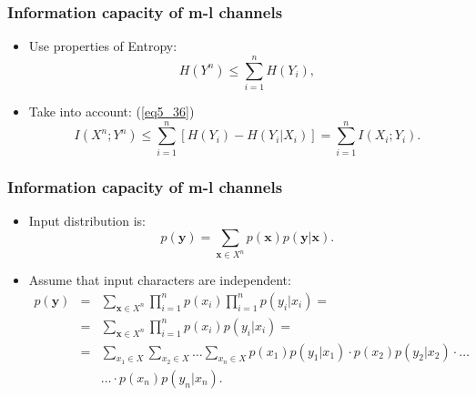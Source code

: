 \documentclass[14pt]{beamer}
\renewcommand{\vec}[1]{\ensuremath{\boldsymbol{#1}}}
\begin{document}
\begin{frame}
\frametitle{Information capacity of m-l channels}
\begin{itemize}

    \item Use properties of Entropy: 
    \begin{equation}
    \label{eq5_37} H\left( {Y^n} \right) \le \sum\limits_{i = 1}^n
    {H(Y_i )} ,
    \end{equation}

    
    \item Take into account: (\ref{eq5_36})
    \small{
    \begin{equation}
    \label{eq5_38} I\left( {X^n;Y^n} \right) \le \sum\limits_{i = 1}^n
    {\left[ {H\left( {Y_i } \right) - H\left( {Y_i \vert X_i }
    \right)} \right]} = \sum\limits_{i = 1}^n {I\left( {X_i ;Y_i }
    \right)} .
    \end{equation}
    }

\end{itemize}
\end{frame}



\begin{frame}
\frametitle{Information capacity of m-l channels}
\begin{itemize}
    
    \item Input distribution is:
    \[
    p({\vec y}) = \sum\limits_{{\vec x} \in X^n} {p({\vec x})%
    p({\vec y}\vert {\vec x})}.
    \]
    
    \item Assume that input characters are independent:
    \small{
    \begin{eqnarray*}
    p({\vec y})& =& \sum\limits_{{\vec x} \in X^n} {\prod\limits_{i =
    1}^n
    {p(x_i )} \prod\limits_{i = 1}^n {p(y_i \vert x_i )} }= \\
    &=& \sum\limits_{{\vec x} \in X^n} {\prod\limits_{i = 1}^n {p(x_i
    )p(y_i
    \vert x_i )} }= \\
    &=& \sum\limits_{x_1 \in X} \sum\limits_{x_2 \in X} \dots
    \sum\limits_{x_n \in X}  p(x_1 )p(y_1 \vert x_1 )\cdot
    p(x_2 )p(y_2 \vert x_2 )\cdot \ldots\\
    &&\ldots \cdot p(x_n )p(y_n \vert x_n )    .
    \end{eqnarray*}
    }

\end{itemize}
\end{frame}
\end{document}
